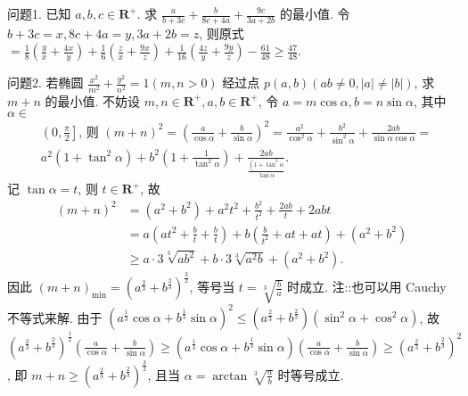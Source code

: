 
问题1. 已知 $a, b, c \in \mathbf{R}^{+}$. 求 $\frac{a}{b+3 c}+\frac{b}{8 c+4 a}+\frac{9 c}{3 a+2 b}$ 的最小值.
令 $b+3 c=x, 8 c+4 a=y, 3 a+2 b=z$, 则原式 $=\frac{1}{8}\left(\frac{y}{x}+\frac{4 x}{y}\right)+\frac{1}{6}\left(\frac{z}{x}+\frac{9 x}{z}\right)+\frac{1}{16}\left(\frac{4 z}{y}+\frac{9 y}{z}\right)-\frac{61}{48} \geqslant \frac{47}{48}$.



问题2. 若椭圆 $\frac{x^2}{m^2}+\frac{y^2}{n^2}=1(m, n>0)$ 经过点 $p(a, b)(a b \neq 0,|a| \neq|b|)$, 求 $m+n$ 的最小值.
不妨设 $m, n \in \mathbf{R}^{+}, a, b \in \mathbf{R}^{+}$, 令 $a=m \cos \alpha, b=n \sin \alpha$, 其中 $\alpha \in$
$$
\begin{aligned}
& \left(0, \frac{\pi}{2}\right] \text {, 则 }(m+n)^2=\left(\frac{a}{\cos \alpha}+\frac{b}{\sin \alpha}\right)^2=\frac{a^2}{\cos ^2 \alpha}+\frac{b^2}{\sin ^2 \alpha}+\frac{2 a b}{\sin \alpha \cos \alpha}= \\
& a^2\left(1+\tan ^2 \alpha\right)+b^2\left(1+\frac{1}{\tan ^2 \alpha}\right)+\frac{2 a b}{\frac{\left(1+\tan ^2 \alpha\right.}{\tan \alpha}} .
\end{aligned}
$$
记 $\tan \alpha=t$, 则 $t \in \mathbf{R}^{+}$, 故
$$
\begin{aligned}
(m+n)^2 & =\left(a^2+b^2\right)+a^2 t^2+\frac{b^2}{t^2}+\frac{2 a b}{t}+2 a b t \\
& =a\left(a t^2+\frac{b}{t}+\frac{b}{t}\right)+b\left(\frac{b}{t^2}+a t+a t\right)+\left(a^2+b^2\right) \\
& \geqslant a \cdot 3 \sqrt[3]{a b^2}+b \cdot 3 \sqrt[3]{a^2 b}+\left(a^2+b^2\right) .
\end{aligned}
$$
因此 $(m+n)_{\min }=\left(a^{\frac{2}{3}}+b^{\frac{2}{3}}\right)^{\frac{3}{2}}$, 等号当 $t=\sqrt[3]{\frac{b}{a}}$ 时成立.
注::也可以用 Cauchy 不等式来解.
由于 $\left(a^{\frac{1}{3}} \cos \alpha+b^{\frac{1}{3}} \sin \alpha\right)^2 \leqslant\left(a^{\frac{2}{3}}+b^{\frac{2}{3}}\right)\left(\sin ^2 \alpha+\cos ^2 \alpha\right)$, 故 $\left(a^{\frac{2}{3}}+b^{\frac{2}{3}}\right)^{\frac{1}{2}}\left(\frac{a}{\cos \alpha}+\frac{b}{\sin \alpha}\right) \geqslant\left(a^{\frac{1}{3}} \cos \alpha+b^{\frac{1}{3}} \sin \alpha\right)\left(\frac{a}{\cos \alpha}+\frac{b}{\sin \alpha}\right) \geqslant\left(a^{\frac{2}{3}}+\right. \left.b^{\frac{2}{3}}\right)^2$, 即 $m+n \geqslant\left(a^{\frac{2}{3}}+b^{\frac{2}{3}}\right)^{\frac{3}{2}}$, 且当 $\alpha=\arctan \sqrt[3]{\frac{a}{b}}$ 时等号成立.



